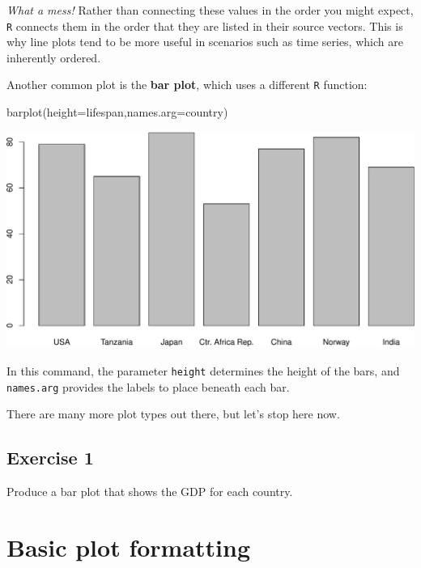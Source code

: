 \documentclass[
]{book}
\newenvironment{Shaded}{\begin{snugshade}}{\end{snugshade}}
\newcommand{\AttributeTok}[1]{\textcolor[rgb]{0.77,0.63,0.00}{#1}}
\newcommand{\FunctionTok}[1]{\textcolor[rgb]{0.00,0.00,0.00}{#1}}
\newcommand{\NormalTok}[1]{#1}
\begin{document}
\emph{What a mess!} Rather than connecting these values in the order you might expect, \texttt{R} connects them in the order that they are listed in their source vectors. This is why line plots tend to be more useful in scenarios such as time series, which are inherently ordered.

Another common plot is the \textbf{bar plot}, which uses a different \texttt{R} function:

\begin{Shaded}
\begin{Highlighting}[]
\FunctionTok{barplot}\NormalTok{(}\AttributeTok{height=}\NormalTok{lifespan,}\AttributeTok{names.arg=}\NormalTok{country)}
\end{Highlighting}
\end{Shaded}

\includegraphics{figures/unnamed-chunk-98-1.pdf}

In this command, the parameter \texttt{height} determines the height of the bars, and \texttt{names.arg} provides the labels to place beneath each bar.

There are many more plot types out there, but let's stop here now.

\hypertarget{exercise-1-4}{%
\subsection*{Exercise 1}\label{exercise-1-4}}

Produce a bar plot that shows the GDP for each country.

\hypertarget{basic-plot-formatting}{%
\section*{Basic plot formatting}\label{basic-plot-formatting}}
\end{document}
